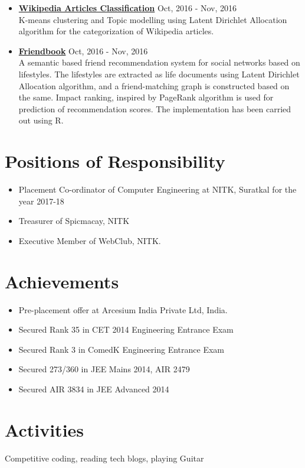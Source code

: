 \documentclass[margin, centered]{res}
\begin{document}
\begin{resume}
\begin{itemize}[leftmargin=*]
 \item \textbf{\href{https://github.com/PrajwalaTM/Text-Mining/tree/master/WikiArticlesClassification}{Wikipedia Articles Classification}} \hfill Oct, 2016 - Nov, 2016\\
 K-means clustering and Topic modelling using Latent Dirichlet Allocation algorithm for the categorization of Wikipedia articles.
 \item \textbf{\href{https://github.com/PrajwalaTM/Friendbook}{Friendbook}}  \hfill Oct, 2016 - Nov, 2016\\
 A semantic based friend recommendation system for social networks based on lifestyles. The lifestyles are extracted as life documents using Latent Dirichlet Allocation algorithm, and a friend-matching graph is constructed based on the same. Impact ranking, inspired by PageRank algorithm is used for prediction of recommendation scores. The implementation has been carried out using R.
\end{itemize}

\section{Positions of Responsibility}
\begin{itemize}
\item Placement Co-ordinator of Computer Engineering at NITK, Suratkal for the year 2017-18
\item Treasurer of Spicmacay, NITK
\item Executive Member of WebClub, NITK.
\end{itemize}

\section{Achievements}
\begin{itemize}
 \item Pre-placement offer at Arcesium India Private Ltd, India. 
 \item Secured Rank 35 in CET 2014 Engineering Entrance Exam
 \item Secured Rank 3 in ComedK Engineering Entrance Exam
 \item Secured 273/360 in JEE Mains 2014, AIR 2479
 \item Secured AIR 3834 in JEE Advanced 2014
\end{itemize}

\section{Activities}
 Competitive coding, reading tech blogs, playing Guitar

\end{resume}
\end{document}
